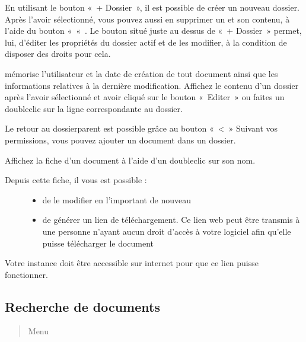 \documentclass[a4paper,10pt,oneside,french]{sphinxmanual}
\begin{document}
\noindent{}

En utilisant le bouton « + Dossier », il est possible de créer un nouveau dossier.
Après l’avoir sélectionné, vous pouvez aussi en supprimer un et son contenu, à l’aide du bouton « \sphinxhyphen{}« .
Le bouton situé juste au dessus de « + Dossier » permet, lui, d’éditer les propriétés du dossier actif et de les modifier, à la condition de disposer des droits pour cela.

 mémorise l’utilisateur et la date de création de tout document ainsi que les informations relatives à la dernière modification. Affichez le contenu d’un dossier après l’avoir sélectionné et avoir cliqué sur le bouton « Editer » ou faites un double\sphinxhyphen{}clic sur la ligne correspondante au dossier.

\noindent{}

Le retour au dossier\sphinxhyphen{}parent est possible grâce au bouton « \textless{} »
Suivant vos permissions, vous pouvez ajouter un document dans un dossier.

Affichez la fiche d’un document à l’aide d’un double\sphinxhyphen{}clic sur son nom.

\noindent{}
\begin{description}
\item[{Depuis cette fiche, il vous est possible :}] \leavevmode\begin{itemize}
\item {} 
de le modifier en l’important de nouveau

\item {} 
de générer un lien de téléchargement. Ce lien web peut être transmis à une personne n’ayant aucun droit d’accès à votre logiciel afin qu’elle puisse télécharger le document

\end{itemize}

\end{description}

 Votre instance doit être accessible sur internet pour que ce lien puisse fonctionner.


\subsection{Recherche de documents}
\label{\detokenize{documents/shared_document:recherche-de-documents}}\begin{quote}

Menu 
\end{quote}
\end{document}
